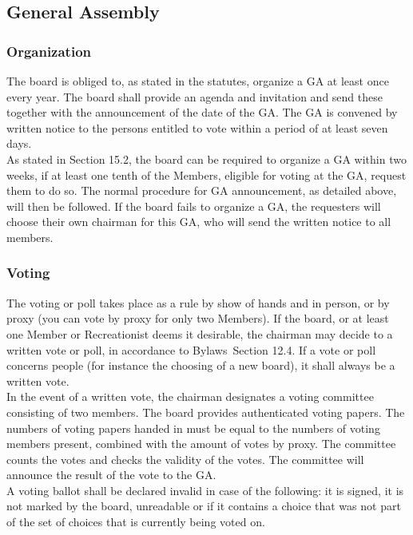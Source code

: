 \documentclass[a4paper]{article}
\newcommand{\Asta}{Bylaws} %
\begin{document}
\subsection{General Assembly}
\subsubsection{Organization}
The board is obliged to, as stated in the statutes, organize a GA at least once every year.  The board shall provide an agenda and invitation and send these together with the announcement of the date of the GA. The GA is convened by written notice to the persons entitled to vote within a period of at least seven days. \\

As stated in Section 15.2, the board can be required to organize a GA within two weeks, if at least one tenth of the Members, eligible for voting at the GA, request them to do so. The normal procedure for GA announcement, as detailed above, will then be followed. If the board fails to organize a GA, the requesters will choose their own chairman for this GA, who will send the written notice to all members.

\subsubsection{Voting}
The voting or poll takes place as a rule by show of hands and in person, or by proxy (you can vote by proxy for only two Members). If the board, or at least one Member or Recreationist deems it desirable, the chairman may decide to a written vote or poll, in accordance to \Asta\ Section 12.4. If a vote or poll concerns people (for instance the choosing of a new board), it shall always be a written vote. \\ 

In the event of a written vote, the chairman designates a voting committee consisting of two members. The board provides authenticated voting papers. The numbers of voting papers handed in must be equal to the numbers of voting members present, combined with the amount of votes by proxy. The committee counts the votes and checks the validity of the votes. The committee will announce the result of the vote to the GA. \\

A voting ballot shall be declared invalid in case of the following: it is signed, it is not marked by the board, unreadable or if it contains a choice that was not part of the set of choices that is currently being voted on.
\end{document}
